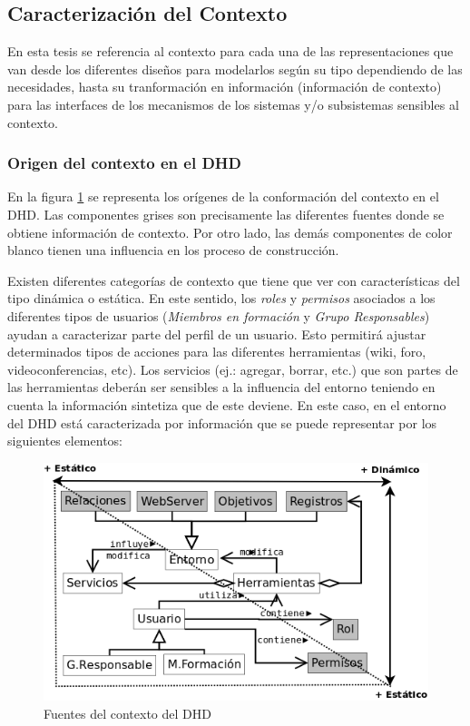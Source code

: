 \subsection {Caracterización del Contexto}

En esta tesis se referencia al contexto para cada una de las
representaciones que van desde los diferentes diseños para modelarlos según su
tipo dependiendo de las necesidades, hasta su tranformación en
información (información de contexto)  para las interfaces de
los mecanismos de los sistemas y/o subsistemas sensibles al contexto.

\subsubsection{Origen del contexto en el DHD}

En la figura \ref{fig:ontologiaContexto} se representa los orígenes de la
conformación del contexto en el DHD. Las componentes grises son
precisamente las diferentes fuentes donde se obtiene
información de contexto. Por otro lado, las demás
componentes de color blanco tienen una influencia en los proceso de
construcción. 

Existen diferentes categorías de contexto que tiene que ver con
características del tipo dinámica o estática. En este sentido, los
\textit{roles} y \textit{permisos} asociados a los diferentes tipos de usuarios
(\textit{Miembros en formación} y \textit{Grupo Responsables}) ayudan a
caracterizar parte del perfil de un usuario. Esto permitirá ajustar determinados
tipos de acciones para las diferentes herramientas (wiki, foro,
videoconferencias, etc). Los servicios (ej.: agregar, borrar, etc.) que son
partes de las herramientas deberán ser sensibles a la influencia del entorno
teniendo en cuenta la información sintetiza que de este deviene. En este caso,
en el entorno del DHD está caracterizada por información que se puede
representar por los siguientes elementos: 


\begin{figure} 
\begin{center}
 \includegraphics [width=5 in,totalheight=3 in] {Ch1/Figuras/contexto.png}
\caption {Fuentes del contexto del DHD}
\label{fig:ontologiaContexto}
\end{center}
\end{figure}



